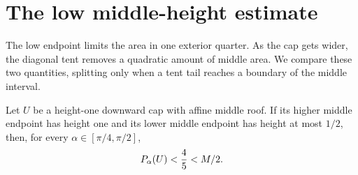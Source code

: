 \section{The low middle-height estimate}\label{sec:variation-estimates}

The low endpoint limits the area in one exterior quarter. As the cap gets
wider, the diagonal tent removes a quadratic amount of middle area.
We compare these two quantities, splitting only when a tent tail
reaches a boundary of the middle interval.

\begin{lemma}\label{lem:variation-low-height}
Let $U$ be a height-one downward cap with affine middle roof.
If its higher middle endpoint has height one and its lower middle
endpoint has height at most $1/2$, then, for every
$\alpha\in[\pi/4,\pi/2]$,
\[
 P_\alpha(U)<\frac45<M/2.
\]
\end{lemma}

